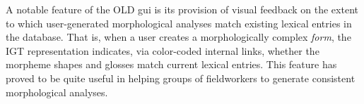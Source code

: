 \documentclass[11pt]{article}
\begin{document}
A notable feature of the OLD \gls{gui} is its provision of visual feedback on the
extent to which user-generated morphological analyses match existing lexical
entries in the database. That is, when a user creates a morphologically complex
\emph{form}, the IGT representation indicates, via color-coded internal links,
whether the morpheme shapes and glosses match current lexical entries. This
feature has proved to be quite useful in helping groups of fieldworkers to
generate consistent morphological analyses.



%
%
%
%
%
%
%
%
%
%
%
%
%
%
%
%
%
\end{document}
